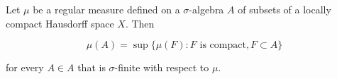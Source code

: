 Let $\mu$ be a regular measure defined on a $\sigma$-algebra $A$ of subsets of a locally compact Hausdorff space $X$. Then

$$\mu(A) = \sup \{ \mu(F) : F \text{ is compact}, F \subset A \}$$

for every $A \in A$ that is $\sigma$-finite with respect to $\mu$.